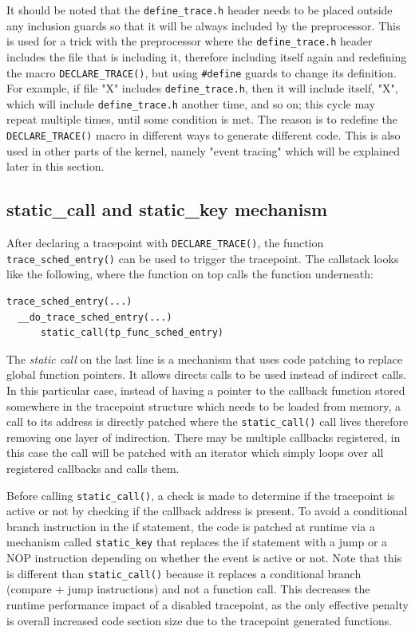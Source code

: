 It should be noted that the \verb|define_trace.h| header needs to be placed
outside any inclusion guards so that it will be always included by the
preprocessor. This is used for a trick with the preprocessor where the
\verb|define_trace.h| header includes the file that is including it, therefore
including itself again and redefining the macro \verb|DECLARE_TRACE()|, but
using \verb|#define| guards to change its definition. For example, if file "X"
includes \verb|define_trace.h|, then it will include itself, "X", which will
include \verb|define_trace.h| another time, and so on; this cycle may repeat
multiple times, until some condition is met. The reason is to redefine the
\verb|DECLARE_TRACE()| macro in different ways to generate different code. This
is also used in other parts of the kernel, namely "event tracing" which will be
explained later in this section.

\subsection{static\_call and static\_key mechanism}

After declaring a tracepoint with \verb|DECLARE_TRACE()|, the function
\verb|trace_sched_entry()| can be used to trigger the tracepoint. The callstack
looks like the following, where the function on top calls the function
underneath:

\begin{verbatim}
trace_sched_entry(...)
  __do_trace_sched_entry(...)
      static_call(tp_func_sched_entry)
\end{verbatim}

The \textit{static call} on the last line is a mechanism that uses code patching
to replace global function pointers. It allows directs calls to be used instead
of indirect calls. In this particular case, instead of having a pointer to the
callback function stored somewhere in the tracepoint structure which needs to be
loaded from memory, a call to its address is directly patched where the
\verb|static_call()| call lives therefore removing one layer of indirection.
There may be multiple callbacks registered, in this case the call will be
patched with an iterator which simply loops over all registered callbacks and
calls them.

Before calling \verb|static_call()|, a check is made to determine if the
tracepoint is active or not by checking if the callback address is present. To
avoid a conditional branch instruction in the if statement, the code is patched
at runtime via a mechanism called \verb|static_key| that replaces the if
statement with a jump or a NOP instruction depending on whether the event is
active or not. Note that this is different than \verb|static_call()| because it
replaces a conditional branch (compare + jump instructions) and not a function
call. This decreases the runtime performance impact of a disabled tracepoint, as
the only effective penalty is overall increased code section size due to the
tracepoint generated functions.

